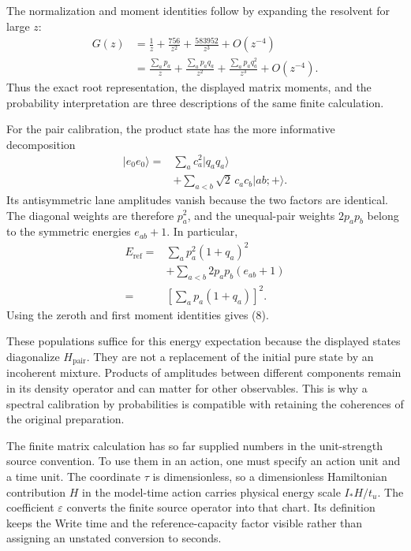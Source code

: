 \documentclass[10pt,twocolumn,letterpaper]{article}
\begin{document}
The normalization and moment identities follow by expanding the resolvent for large $z$:
\[
\begin{aligned}
G(z)&=\frac{1}{z}+\frac{756}{z^2}+\frac{583952}{z^3}
+O(z^{-4})\\
&=\frac{\sum_a p_a}{z}
+\frac{\sum_a p_aq_a}{z^2}
+\frac{\sum_a p_aq_a^2}{z^3}+O(z^{-4}).
\end{aligned}
\]
Thus the exact root representation, the displayed matrix moments, and the probability interpretation are three descriptions of the same finite calculation.

For the pair calibration, the product state has the more informative decomposition
\[
\begin{aligned}
|e_0e_0\rangle
={}&\sum_a c_a^2|q_aq_a\rangle\\
&+\sum_{a<b}\sqrt{2}\,c_ac_b|ab;+\rangle.
\end{aligned}
\]
Its antisymmetric lane amplitudes vanish because the two factors are identical. The diagonal weights are therefore $p_a^2$, and the unequal-pair weights $2p_ap_b$ belong to the symmetric energies $e_{ab}+1$. In particular,
\[
\begin{aligned}
E_{\mathrm{ref}}
={}&\sum_a p_a^2(1+q_a)^2\\
&+\sum_{a<b}2p_ap_b(e_{ab}+1)\\
={}&\left[\sum_a p_a(1+q_a)\right]^2.
\end{aligned}
\]
Using the zeroth and first moment identities gives (8).

These populations suffice for this energy expectation because the displayed states diagonalize $H_{\mathrm{pair}}$. They are not a replacement of the initial pure state by an incoherent mixture. Products of amplitudes between different components remain in its density operator and can matter for other observables. This is why a spectral calibration by probabilities is compatible with retaining the coherences of the original preparation.





The finite matrix calculation has so far supplied numbers in the unit-strength source convention. To use them in an action, one must specify an action unit and a time unit. The coordinate $\tau$ is dimensionless, so a dimensionless Hamiltonian contribution $H$ in the model-time action carries physical energy scale $I_*H/t_u$. The coefficient $\varepsilon$ converts the finite source operator into that chart. Its definition keeps the Write time and the reference-capacity factor visible rather than assigning an unstated conversion to seconds.
\end{document}

